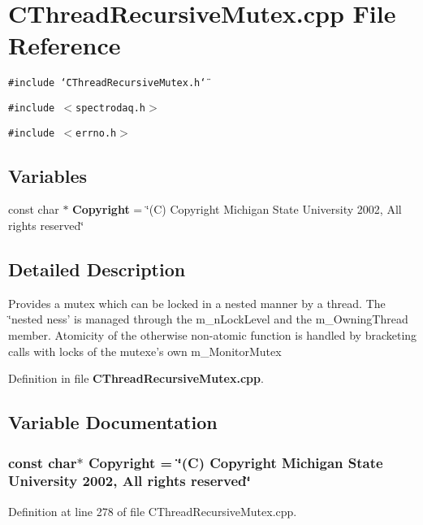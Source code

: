 \section{CThread\-Recursive\-Mutex.cpp File Reference}
\label{CThreadRecursiveMutex_8cpp}
{\tt \#include \char`\"{}CThread\-Recursive\-Mutex.h\char`\"{}}\par
{\tt \#include $<$spectrodaq.h$>$}\par
{\tt \#include $<$errno.h$>$}\par
\subsection*{Variables}
\begin{CompactItemize}
\item 
const char $\ast$ {\bf Copyright} = \char`\"{}(C) Copyright Michigan State University 2002, All rights reserved\char`\"{}
\end{CompactItemize}


\subsection{Detailed Description}
  Provides a mutex which can be locked in a nested manner by a thread. The \char`\"{}nested ness' is managed through the m\_\-n\-Lock\-Level and the  m\_\-Owning\-Thread member. Atomicity of the otherwise non-atomic  function is handled by bracketing calls with locks of the mutexe's own m\_\-Monitor\-Mutex



Definition in file {\bf CThread\-Recursive\-Mutex.cpp}.

\subsection{Variable Documentation}
\subsubsection{\setlength{\rightskip}{0pt plus 5cm}const char$\ast$ Copyright = \char`\"{}(C) Copyright Michigan State University 2002, All rights reserved\char`\"{}\hspace{0.3cm}{\tt  [static]}}\label{CThreadRecursiveMutex_8cpp_a0}




Definition at line 278 of file CThread\-Recursive\-Mutex.cpp.